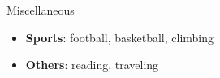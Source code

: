 \documentclass{resume} %
\begin{document}

\begin{rSection}{Miscellaneous}
\begin{itemize}
\item \textbf{Sports}: football, basketball, climbing
\item \textbf{Others}: reading, traveling 
\end{itemize}

\end{rSection}







\end{document}
